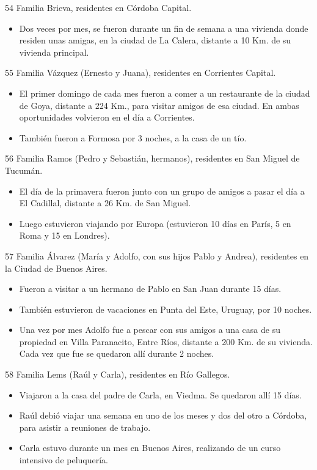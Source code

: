 \documentclass[
  openany]{book}
\providecommand{\tightlist}{%
  \setlength{\itemsep}{0pt}\setlength{\parskip}{0pt}}
\begin{document}
54 Familia Brieva, residentes en Córdoba Capital.

\begin{itemize}
\tightlist
\item
  Dos veces por mes, se fueron durante un fin de semana a una vivienda donde residen unas amigas, en la ciudad de La Calera, distante a 10 Km. de su vivienda principal.
\end{itemize}

55 Familia Vázquez (Ernesto y Juana), residentes en Corrientes Capital.

\begin{itemize}
\item
  El primer domingo de cada mes fueron a comer a un restaurante de la ciudad de Goya, distante a 224 Km., para visitar amigos de esa ciudad. En ambas oportunidades volvieron en el día a Corrientes.
\item
  También fueron a Formosa por 3 noches, a la casa de un tío.
\end{itemize}

56 Familia Ramos (Pedro y Sebastián, hermanos), residentes en San Miguel de Tucumán.

\begin{itemize}
\item
  El día de la primavera fueron junto con un grupo de amigos a pasar el día a El Cadillal, distante a 26 Km. de San Miguel.
\item
  Luego estuvieron viajando por Europa (estuvieron 10 días en París, 5 en Roma y 15 en Londres).
\end{itemize}

57 Familia Álvarez (María y Adolfo, con sus hijos Pablo y Andrea), residentes en la Ciudad de Buenos Aires.

\begin{itemize}
\item
  Fueron a visitar a un hermano de Pablo en San Juan durante 15 días.
\item
  También estuvieron de vacaciones en Punta del Este, Uruguay, por 10 noches.
\item
  Una vez por mes Adolfo fue a pescar con sus amigos a una casa de su propiedad en Villa Paranacito, Entre Ríos, distante a 200 Km. de su vivienda. Cada vez que fue se quedaron allí durante 2 noches.
\end{itemize}

58 Familia Lems (Raúl y Carla), residentes en Río Gallegos.

\begin{itemize}
\item
  Viajaron a la casa del padre de Carla, en Viedma. Se quedaron allí 15 días.
\item
  Raúl debió viajar una semana en uno de los meses y dos del otro a Córdoba, para asistir a reuniones de trabajo.
\item
  Carla estuvo durante un mes en Buenos Aires, realizando de un curso intensivo de peluquería.
\end{itemize}
\end{document}
